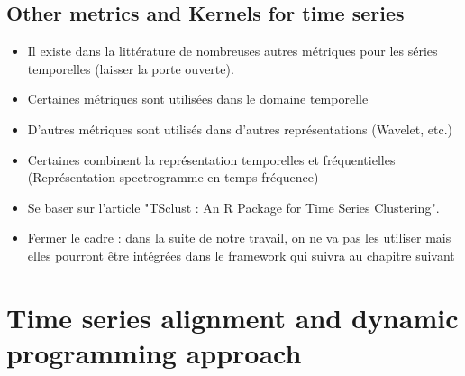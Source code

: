 \subsection{Other metrics and Kernels for time series}
\begin{itemize}
	\item Il existe dans la littérature de nombreuses autres métriques pour les séries temporelles (laisser la porte ouverte).
	\item Certaines métriques sont utilisées dans le domaine temporelle
	\item D'autres métriques sont utilisés dans d'autres représentations (Wavelet, etc.)
	\item Certaines combinent la représentation temporelles et fréquentielles (Représentation spectrogramme en temps-fréquence)
	\item Se baser sur l'article "TSclust : An R Package for Time Series Clustering".
	\item Fermer le cadre : dans la suite de notre travail, on ne va pas les utiliser mais elles pourront être intégrées dans le framework qui suivra au chapitre suivant
\end{itemize}


\section{Time series alignment and dynamic programming approach}

